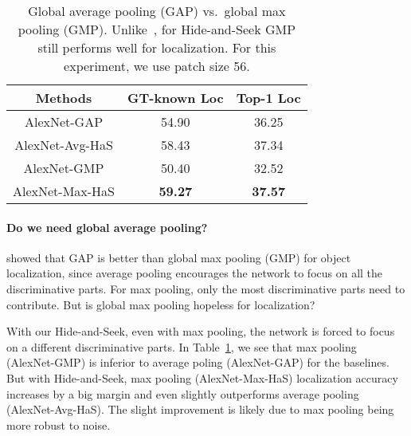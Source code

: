 \begin{table}[t!]
        \begin{center}
            \footnotesize
            \begin{tabular}{| c | c | c|}
            \hline    	
            Methods & GT-known Loc &  Top-1 Loc \\
            \hline
            AlexNet-GAP            & 54.90 & 36.25 \\
            AlexNet-Avg-HaS            & 58.43 & 37.34   \\
            AlexNet-GMP            & 50.40 & 32.52  \\
            AlexNet-Max-HaS            & \textbf{59.27} &  \textbf{37.57}  \\

            \hline
             \end{tabular}
                    \caption{Global average pooling (GAP) vs.~global max pooling (GMP).  Unlike~\cite{zhou-cvpr2016}, for Hide-and-Seek GMP still performs well for localization. For this experiment, we use patch size 56.}
                    \label{table:max_results}
                    \end{center}
                    \vspace*{-0.15in}
                    \end{table}



\vspace{-10pt}
\paragraph{Do we need global average pooling?}  \cite{zhou-cvpr2016} showed that GAP is better than global max pooling (GMP) for object localization, since average pooling encourages the network to focus on all the discriminative parts.  For max pooling, only the most discriminative parts need to contribute. But is global max pooling hopeless for localization?


With our Hide-and-Seek, even with max pooling, the network is forced to focus on a different discriminative parts.   In Table~\ref{table:max_results}, we see that max pooling (AlexNet-GMP) is inferior to average poling (AlexNet-GAP) for the baselines. But with Hide-and-Seek, max pooling (AlexNet-Max-HaS) localization accuracy increases by a big margin and even slightly outperforms average pooling (AlexNet-Avg-HaS). The slight improvement is likely due to max pooling being more robust to noise.




